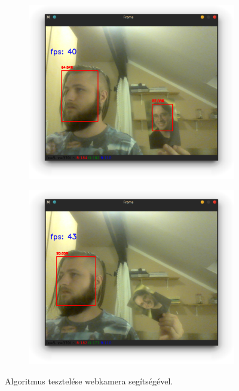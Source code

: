 \begin{figure}
    \centering
    \begin{subfigure}[b]{0.45\linewidth}
        \includegraphics[width=\linewidth]{figures/selection_webcam_linus_good.png}
    \end{subfigure}
    \begin{subfigure}[b]{0.45\linewidth}
        \includegraphics[width=\linewidth]{figures/selection_webcam_linus_bad.png}
    \end{subfigure}
    \caption{Algoritmus tesztelése webkamera segítségével.}
    \label{fig:selection_webcam}
\end{figure}

